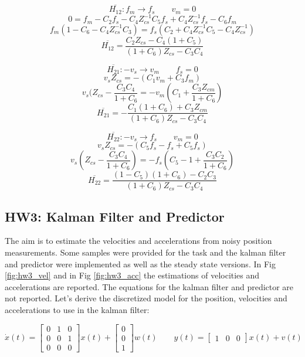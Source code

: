 \documentclass[a4paper,12pt]{article}
\begin{document}
\bigskip

\[
    \overline{H_{12}} : f_m \rightarrow f_s \qquad v_m = 0
    \]\[
    0 = f_m -C_2f_s -C_4Z_{cs}^{-1}C_5f_s + C_4Z_{cs}^{-1}f_s - C_6f_m
\]\[
    f_m(1-C_6-C_4Z_{cs}^{-1}C_3) = f_s(C_2+C_4Z_{cs}^{-1}C_5-C_4Z_{cs}^{-1})
    \]\[
    \overline{H_{12}} = \frac{C_2Z_{cs}-C_4(1+C_5)}{(1+C_6)Z_{cs} - C_3C_4}
\]

\bigskip

\[
    \overline{H_{21}} : -v_s \rightarrow v_m \qquad f_s = 0
    \]\[
    v_sZ_{cs} = -(C_1v_m + C_3f_m)
\]\[
    v_s(Z_{cs} - \frac{C_3C_4}{1+C_6} = -v_m(C_1 + \frac{C_3Z_{cm}}{1+C_6})
    \]\[
    \overline{H_{21}} = -\frac{C_1(1+C_6) + C_3Z_{cm}}{(1+C_6)Z_{cs} - C_3C_4}
\]


\bigskip

\[
    \overline{H_{22}} : -v_s \rightarrow f_s \qquad v_m = 0
\]\[
    v_sZ_{cs} = -(C_5f_s - f_s +C_5f_s)
\]\[
    v_s(Z_{cs}-\frac{C_3C_4}{1+C_6}) = -f_s(C_5 - 1 + \frac{C_3C_2}{1+C_6})
\]\[
    \overline{H_{22}} = \frac{(1-C_5)(1+C_6)-C_2C_3}{(1+C_6)Z_{cs}-C_3C_4}
\]

\subsection{HW3: Kalman Filter and Predictor}
The aim is to estimate the velocities and accelerations from noisy position measurements. Some samples were provided for the task and the kalman filter and predictor were implemented as well as the steady state versions. In Fig \ref{fig:hw3_vel} and in Fig \ref{fig:hw3_acc} the estimations of velocities and accelerations are reported. The equations for the kalman filter and predictor are not reported. Let's derive the discretized model for the position, velocities and accelerations to use in the kalman filter:

\begin{equation}
    \dot{x}(t) =  \begin{bmatrix}  0&1&0 \\ 0&0&1\\0&0&0 \end{bmatrix} x(t) + \begin{bmatrix}  0\\0\\1 \end{bmatrix} w(t)
    \qquad
    y(t) = \begin{bmatrix}  1&0&0 \end{bmatrix}x(t) + v(t)
\end{equation}
\end{document}
